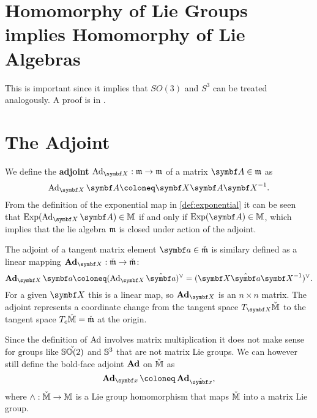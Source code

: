 \section{Homomorphy of Lie Groups implies Homomorphy of Lie Algebras}

This is important since it implies that $SO(3)$ and $S^3$ can be treated analogously. A proof is in \cite[Corr. 20]{howe_very_1983}.

\section{The Adjoint}

We define the \textbf{adjoint} $\Ad_\X : \lM \rightarrow \lM$ of a matrix $\A \in \lM$ as
\begin{equation}
  \Ad_{\X} \A \coloneq \X \A \X^{-1}.
\end{equation}
From the definition of the exponential map in \eqref{def:exponential} it can be seen that $\Exp( \Ad_\X \A) \in \M$ if and only if $\Exp (\A) \in \M$, which implies that the lie algebra $\mathfrak{m}$ is closed under action of the adjoint.

The adjoint of a tangent matrix element $\a \in \clM$ is similary defined as a linear mapping $\bAd_\X : \clM \rightarrow \clM$:
\begin{equation}
  \bAd_\X \a \coloneq (\Ad_{\X} \hat \a)^\vee = (\X \hat \a \X^{-1})^\vee.
\end{equation}
For a given $\X$ this is a linear map, so $\bAd_\X$ is an $n \times n$ matrix. The adjoint represents a coordinate change from the tangent space $T_\X \cM$ to the tangent space $T_e \check{\mathbb{M}} = \check{\mathfrak{m}}$ at the origin.

\begin{remark}
  Since the definition of $\operatorname{Ad}$ involves matrix multiplication it does not make sense for groups like $\check{{\mathbb{SO}(2)}}$ and ${\mathbb{S}^3}$ that are not matrix Lie groups. We can however still define the bold-face adjoint $\operatorname{\textbf{Ad}}$ on $\check{\mathbb{M}}$ as
  \begin{equation}
    \bAd_{\x} \coloneq \bAd_{\hat \x},
  \end{equation}
  where $\wedge : \check{\mathbb{M}} \rightarrow \mathbb{M}$ is a Lie group homomorphism that maps $\check{\mathbb{M}}$ into a matrix Lie group.
\end{remark}

